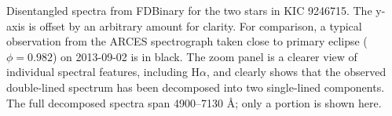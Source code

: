 \label{fig:twospectra} Disentangled spectra from FDBinary for the two stars in KIC 9246715. The y-axis is offset by an arbitrary amount for clarity. For comparison, a typical observation from the ARCES spectrograph taken close to primary eclipse ($\phi = 0.982$) on 2013-09-02 is in black. The zoom panel is a clearer view of individual spectral features, including $\textrm{H}\alpha$, and clearly shows that the observed double-lined spectrum has been decomposed into two single-lined components. The full decomposed spectra span 4900--7130 \AA; only a portion is shown here.
  
  
  
  